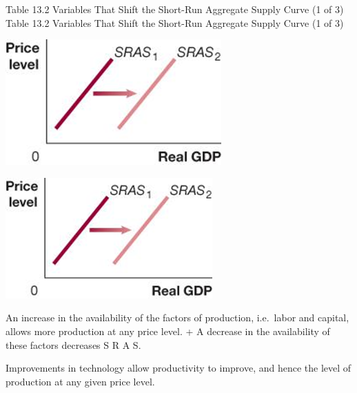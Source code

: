 \documentclass[
  12pt,
  ignorenonframetext,
]{beamer}
\begin{document}
\begin{frame}{Table 13.2 Variables That Shift the Short-Run Aggregate
Supply Curve (1 of 3)}
\protect\hypertarget{table-13.2-variables-that-shift-the-short-run-aggregate-supply-curve-1-of-3}{}
Table 13.2 Variables That Shift the Short-Run Aggregate Supply Curve (1
of 3)

\includegraphics[width=\textwidth,height=0.99\textheight]{imgs3/img_slide27a.png}

\includegraphics[width=\textwidth,height=0.99\textheight]{imgs3/img_slide27b.png}

An increase in the availability of the factors of production, i.e.~labor
and capital, allows more production at any price level. + A decrease in
the availability of these factors decreases S R A S.

Improvements in technology allow productivity to improve, and hence the
level of production at any given price level.
\end{frame}
\end{document}
